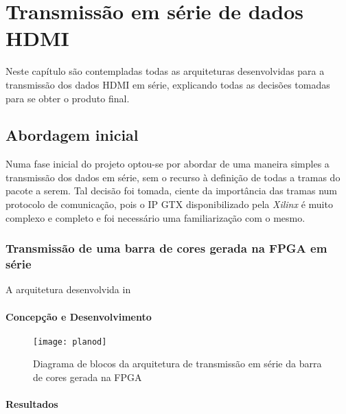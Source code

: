 \chapter{Transmissão em série de dados HDMI} \label{chap:chap5}

Neste capítulo são contempladas todas as arquiteturas desenvolvidas para a transmissão dos dados HDMI em série, explicando todas as decisões tomadas para se obter o produto final. 

\section{Abordagem inicial}

Numa fase inicial do projeto optou-se por abordar de uma maneira simples a transmissão dos dados em série, sem o recurso à definição de todas a tramas do pacote a serem. Tal decisão foi tomada, ciente da importância das tramas num protocolo de comunicação, pois o IP GTX disponibilizado pela \textit{Xilinx} é muito complexo e completo e foi necessário uma familiarização com o mesmo.

\subsection{Transmissão de uma barra de cores gerada na FPGA em série}

A arquitetura desenvolvida in


\subsubsection*{Concepção e Desenvolvimento}
\begin{figure}[h!]
	\begin{center}
		\leavevmode
		\texttt{[image: planod]}
		\captionsetup{width=1.0\linewidth}
		\caption[Diagrama de blocos da arquitetura de transmissão em série da barra de cores gerada na FPGA]{Diagrama de blocos da arquitetura de transmissão em série da barra de cores gerada na FPGA}
		\label{fig:planD}
	\end{center}
\end{figure}
\subsubsection*{Resultados}




%
%
